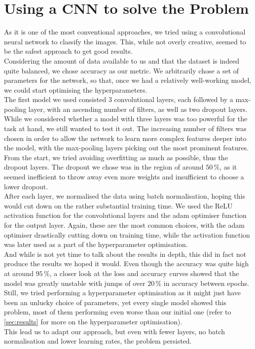 \chapter{Using a CNN to solve the Problem}
\label{ch:solution}

As it is one of the most conventional approaches, we tried using a convolutional neural network to classify the images.
This, while not overly creative, seemed to be the safest approach to get good results. \\

Considering the amount of data available to us and that the dataset is indeed quite balanced, we chose accuracy as our metric.
We arbitrarily chose a set of parameters for the network, so that, once we had a relatively well-working model,
we could start optimising the hyperparameters. \\

The first model we used consisted $3$ convolutional layers, each followed by a max-pooling layer, with an ascending number of filters,
as well as two dropout layers.
While we considered whether a model with three layers was too powerful for the task at hand, we still wanted to test it out.
The increasing number of filters was chosen in order to allow the network to learn more complex features deeper into the model,
with the max-pooling layers picking out the most prominent features.
From the start, we tried avoiding overfitting as much as possible, thus the dropout layers.
The dropout we chose was in the region of around $50 \,\%$, as it seemed inefficient to throw away even more weights and insufficient to choose a lower dropout. \\

After each layer, we normalised the data using batch normalisation, hoping this would cut down on the rather substantial training time.
We used the ReLU activation function for the convolutional layers and the adam optimiser function for the output layer.
Again, these are the most common choices, with the adam optimiser drastically cutting down on training time, 
while the activation function was later used as a part of the hyperparameter optimisation. \\

And while is not yet time to talk about the results in depth, this did in fact not produce the results we hoped it would.
Even though the accuracy was quite high at around $95 \,\%$, a closer look at the loss and accuracy curves showed that the model was greatly unstable
with jumps of over $20 \,\%$ in accuracy between epochs.
Still, we tried performing a hyperparameter optimisation as it might just have been an unlucky choice of parameters, yet every single model showed this problem,
most of them performing even worse than our initial one (refer to \autoref{sec:results} for more on the hyperparameter optimisation). \\

This lead us to adapt our approach, but even with fewer layers, no batch normalisation and lower learning rates, the problem persisted.
